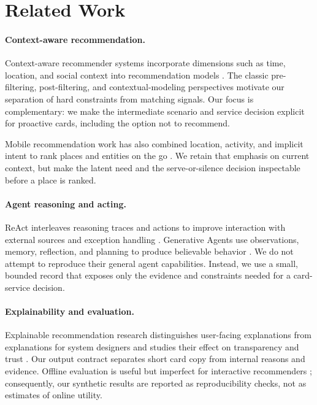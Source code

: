 \documentclass[10pt]{article}
\begin{document}
\section{Related Work}

\paragraph{Context-aware recommendation.}
Context-aware recommender systems incorporate dimensions such as time, location, and social context into recommendation models \citep{adomavicius2011context}. The classic pre-filtering, post-filtering, and contextual-modeling perspectives motivate our separation of hard constraints from matching signals. Our focus is complementary: we make the intermediate scenario and service decision explicit for proactive cards, including the option not to recommend.

Mobile recommendation work has also combined location, activity, and implicit intent to rank places and entities on the go \citep{zhuang2011mobile}. We retain that emphasis on current context, but make the latent need and the serve-or-silence decision inspectable before a place is ranked.

\paragraph{Agent reasoning and acting.}
ReAct interleaves reasoning traces and actions to improve interaction with external sources and exception handling \citep{yao2023react}. Generative Agents use observations, memory, reflection, and planning to produce believable behavior \citep{park2023generative}. We do not attempt to reproduce their general agent capabilities. Instead, we use a small, bounded record that exposes only the evidence and constraints needed for a card-service decision.

\paragraph{Explainability and evaluation.}
Explainable recommendation research distinguishes user-facing explanations from explanations for system designers and studies their effect on transparency and trust \citep{zhang2018explainable,chen2022measuring}. Our output contract separates short card copy from internal reasons and evidence. Offline evaluation is useful but imperfect for interactive recommenders \citep{aouali2022offline,hidasi2023flaws}; consequently, our synthetic results are reported as reproducibility checks, not as estimates of online utility.
\end{document}
